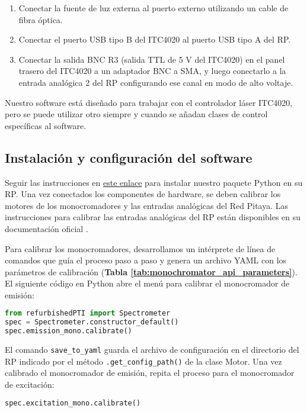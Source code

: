 \begin{enumerate}
    \item Conectar la fuente de luz externa al puerto externo utilizando un cable de fibra óptica.
    \item Conectar el puerto USB tipo B del ITC4020 al puerto USB tipo A del RP.
    \item Conectar la salida BNC R3 (salida TTL de 5 V del ITC4020) en el panel trasero del ITC4020 a un adaptador BNC a SMA, y luego conectarlo a la entrada analógica 2 del RP configurando ese canal en modo de alto voltaje.
\end{enumerate}

Nuestro software está diseñado para trabajar con el controlador láser ITC4020, pero se puede utilizar otro siempre y cuando se añadan clases de control específicas al software.

\subsection{Instalación y configuración del software} 

Seguir las instrucciones en \href{https://github.com/tdinapoli/refurbishedPTI}{este enlace}\cite{napoli_tdinapoli_2024} para instalar nuestro paquete Python en su RP. 
Una vez conectados los componentes de hardware, se deben calibrar los motores de los monocromadores y las entradas analógicas del Red Pitaya. 
Las instrucciones para calibrar las entradas analógicas del RP están disponibles en su documentación oficial \cite{rp_docs}.

Para calibrar los monocromadores, desarrollamos un intérprete de línea de comandos que guía el proceso paso a paso y genera un archivo YAML con los parámetros de calibración (\textbf{Tabla \ref{tab:monochromator_api_parameters}}). El siguiente código en Python abre el menú para calibrar el monocromador de emisión:

\begin{lstlisting}[language=Python]
from refurbishedPTI import Spectrometer
spec = Spectrometer.constructor_default()
spec.emission_mono.calibrate()
\end{lstlisting}

El comando \texttt{save\_to\_yaml} guarda el archivo de configuración en el directorio del RP indicado por el método \texttt{.get\_config\_path()} de la clase Motor. Una vez calibrado el monocromador de emisión, repita el proceso para el monocromador de excitación:

\begin{lstlisting}[language=Python]
spec.excitation_mono.calibrate()
\end{lstlisting}

